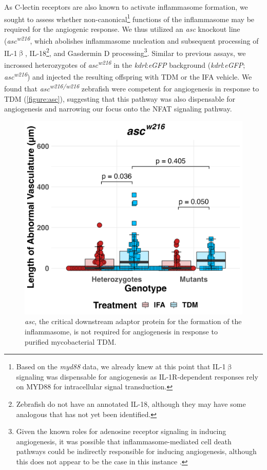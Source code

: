 As C\hyp{}lectin receptors are also known to activate inflammasome formation, we sought to assess whether non\hyp{}canonical\footnote{Based on the \textit{myd88} data, we already knew at this point that IL\hyp{}1$\upbeta$ signaling was dispensable for angiogenesis as IL\hyp{}1R\hyp{}dependent responses rely on MYD88 for intracellular signal transduction.} functions of the inflammasome may be required for the angiogenic response. We thus utilized an \textit{asc} knockout line (\textit{asc\textsuperscript{w216}}, which abolishes inflammasome nucleation and subsequent processing of IL\hyp{}1$\upbeta$, IL\hyp{}18\footnote{Zebrafish do not have an annotated IL\hyp{}18, although they may have some analogous that has not yet been identified.}, and Gasdermin D processing\footnote{Given the known roles for adenosine receptor signaling in inducing angiogenesis, it was possible that inflammasome\hyp{}mediated cell death pathways could be indirectly responsible for inducing angiogenesis, although this does not appear to be the case in this instance \citep{Clark2007, Montesinos2002, Dusseau1986, Auchampach2007}.}. Similar to previous assays, we incrossed heterozygotes of \textit{asc\textsuperscript{w216}} in the \textit{kdrl}:\textit{eGFP} background (\textit{kdrl}:\textit{eGFP}; \textit{asc\textsuperscript{w216}}) and injected the resulting offspring with TDM or the IFA vehicle. We found that \textit{asc\textsuperscript{w216/w216}} zebrafish were competent for angiogenesis in response to TDM (\autoref{figure:asc}), suggesting that this pathway was also dispensable for angiogenesis and narrowing our focus onto the NFAT signaling pathway.

\begin{figure}
\centering
\includegraphics[width=\textwidth]{images/asc_tdm_110922.png}
\caption{\textit{asc}, the critical downstream adaptor protein for the formation of the inflammasome, is not required for angiogenesis in response to purified mycobacterial TDM.}
\label{figure:asc}
\end{figure}


